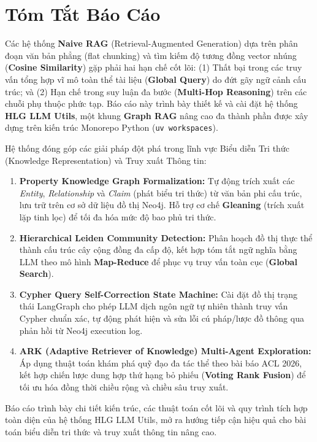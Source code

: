 \documentclass[11pt,a4paper]{report}
\begin{document}
\section*{Tóm Tắt Báo Cáo}

Các hệ thống \textbf{Naive RAG} (Retrieval-Augmented Generation) dựa trên phân đoạn văn bản phẳng (flat chunking) và tìm kiếm độ tương đồng vector nhúng (\textbf{Cosine Similarity}) gặp phải hai hạn chế cốt lõi: (1) Thất bại trong các truy vấn tổng hợp vĩ mô toàn thể tài liệu (\textbf{Global Query}) do đứt gãy ngữ cảnh cấu trúc; và (2) Hạn chế trong suy luận đa bước (\textbf{Multi-Hop Reasoning}) trên các chuỗi phụ thuộc phức tạp. Báo cáo này trình bày thiết kế và cài đặt hệ thống \textbf{HLG LLM Utils}, một khung \textbf{Graph RAG} nâng cao đa thành phần được xây dựng trên kiến trúc Monorepo Python (\texttt{uv workspaces}).

Hệ thống đóng góp các giải pháp đột phá trong lĩnh vực Biểu diễn Tri thức (Knowledge Representation) và Truy xuất Thông tin:
\begin{enumerate}[leftmargin=*]
    \item \textbf{Property Knowledge Graph Formalization:} Tự động trích xuất các \textit{Entity}, \textit{Relationship} và \textit{Claim} (phát biểu tri thức) từ văn bản phi cấu trúc, lưu trữ trên cơ sở dữ liệu đồ thị Neo4j. Hỗ trợ cơ chế \textbf{Gleaning} (trích xuất lặp tinh lọc) để tối đa hóa mức độ bao phủ tri thức.
    \item \textbf{Hierarchical Leiden Community Detection:} Phân hoạch đồ thị thực thể thành cấu trúc cây cộng đồng đa cấp độ, kết hợp tóm tắt ngữ nghĩa bằng LLM theo mô hình \textbf{Map-Reduce} để phục vụ truy vấn toàn cục (\textbf{Global Search}).
    \item \textbf{Cypher Query Self-Correction State Machine:} Cài đặt đồ thị trạng thái LangGraph cho phép LLM dịch ngôn ngữ tự nhiên thành truy vấn Cypher chuẩn xác, tự động phát hiện và sửa lỗi cú pháp/lược đồ thông qua phản hồi từ Neo4j execution log.
    \item \textbf{ARK (Adaptive Retriever of Knowledge) Multi-Agent Exploration:} Áp dụng thuật toán khám phá quỹ đạo đa tác thể theo bài báo ACL 2026, kết hợp chiến lược dung hợp thứ hạng bỏ phiếu (\textbf{Voting Rank Fusion}) để tối ưu hóa đồng thời chiều rộng và chiều sâu truy xuất.
\end{enumerate}

Báo cáo trình bày chi tiết kiến trúc, các thuật toán cốt lõi và quy trình tích hợp toàn diện của hệ thống HLG LLM Utils, mở ra hướng tiếp cận hiệu quả cho bài toán biểu diễn tri thức và truy xuất thông tin nâng cao.
\end{document}
